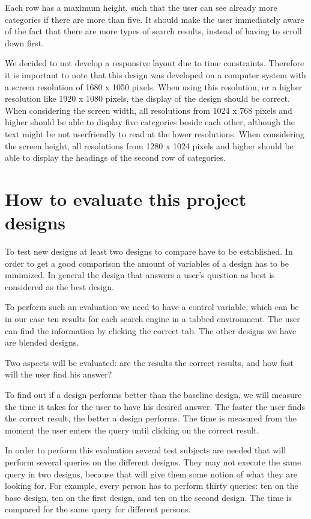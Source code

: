 \documentclass[12pt]{article}
\begin{document}
Each row has a maximum height, such that the user can see already more categories if there are more than five.
It should make the user immediately aware of the fact that there are more types of search results, instead of having to scroll down first.

We decided to not develop a responsive layout due to time constraints.
Therefore it is important to note that this design was developed on a computer system with a screen resolution of 1680 x 1050 pixels.
When using this resolution, or a higher resolution like 1920 x 1080 pixels, the display of the design should be correct.
When considering the screen width, all resolutions from 1024 x 768 pixels and higher should be able to display five categories beside each other, although the text might be not userfriendly to read at the lower resolutions.
When considering the screen height, all resolutions from 1280 x 1024 pixels and higher should be able to display the headings of the second row of categories.

\section{How to evaluate this project designs}
\label{sec:evaluation}
To test new designs at least two designs to compare have to be established. 
In order to get a good comparison the amount of variables of a design has to be minimized. 
In general the design that answers a user's question as best is considered as the best design.

To perform such an evaluation we need to have a control variable, which can be in our case ten results for each search engine in a tabbed environment. The user can find the information by clicking the correct tab. The other designs we have are blended designs.

Two aspects will be evaluated: are the results the correct results, and how fast will the user find his answer?

To find out if a design performs better than the baseline design, we will measure the time it takes for the user to have his desired answer. The faster the user finds the correct result, the better a design performs. The time is measured from the moment the user enters the query until clicking on the correct result. 

In order to perform this evaluation several test subjects are needed that will perform several queries on the different designs. They may not execute the same query in two designs, because that will give them some notion of what they are looking for. For example, every person has to perform thirty queries: ten on the base design, ten on the first design, and ten on the second design. The time is compared for the same query for different persons.
\end{document}

